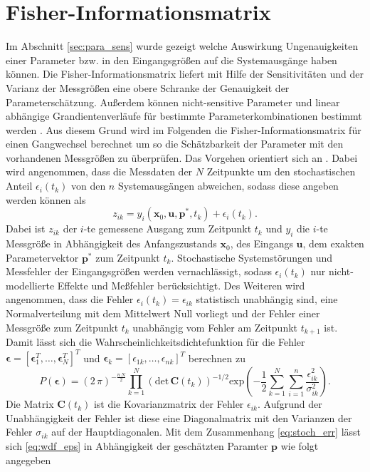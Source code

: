 \section{Fisher-Informationsmatrix}
Im Abschnitt \ref{sec:para_sens} wurde gezeigt welche Auswirkung Ungenauigkeiten einer Parameter bzw. in den Eingangsgrößen auf die Systemausgänge haben können. Die Fisher-Informationsmatrix liefert mit Hilfe der Sensitivitäten und der Varianz der Messgrößen eine obere Schranke der Genauigkeit der Parameterschätzung. Außerdem können nicht-sensitive Parameter und linear abhängige Grandientenverläufe für bestimmte Parameterkombinationen bestimmt werden \cite{Majer.1998}. Aus diesem Grund wird im Folgenden die Fisher-Informationsmatrix für einen Gangwechsel berechnet um so die Schätzbarkeit der Parameter mit den vorhandenen Messgrößen zu überprüfen. Das Vorgehen orientiert sich an \cite{Majer.1998}. Dabei wird angenommen, dass die Messdaten der $N$ Zeitpunkte um den stochastischen Anteil $\epsilon_i(t_k)$ von den $n$ Systemausgängen abweichen, sodass diese angeben werden können als
\begin{equation}\label{eq:stoch_err}
z_{ik} = y_i(\pmb{x}_0,\pmb{u},\pmb{p}^*,t_k) + \epsilon_i(t_k).
\end{equation}
Dabei ist $z_{ik}$ der $i$-te gemessene Ausgang zum Zeitpunkt $t_k$ und $y_i$ die $i$-te Messgröße in Abhängigkeit des Anfangszustands $\pmb{x}_0$, des Eingangs $\pmb{u}$, dem exakten Parametervektor $\pmb{p}^*$ zum Zeitpunkt $t_k$. Stochastische Systemstörungen und Messfehler der Eingangsgrößen werden vernachlässigt, sodass $\epsilon_i(t_k)$ nur nicht-modellierte Effekte und Meßfehler berücksichtigt. Des Weiteren wird angenommen, dass die Fehler  $\epsilon_i(t_k) = \epsilon_{ik}$ statistisch unabhängig sind, eine Normalverteilung mit dem Mittelwert Null vorliegt und der Fehler einer Messgröße zum Zeitpunkt $t_k$ unabhängig vom Fehler am Zeitpunkt $t_{k+1}$ ist. Damit lässt sich die Wahrscheinlichkeitsdichtefunktion für die Fehler $\pmb{\epsilon} = [\pmb{\epsilon}_1^T,\dots,\pmb{\epsilon}_N^T]^T$ und $\pmb{\epsilon}_k = [\epsilon_{1k},\dots,\epsilon_{nk}]^T$ berechnen zu
\begin{equation}\label{eq:wdf_eps}
P(\pmb{\epsilon}) = (2\, \pi)^{-\frac{n\,N}{2}}\prod^N_{k=1}\left(\mathrm{det}\,\pmb{C}(t_k)\right)^{-1/2}\mathrm{exp}\left(-\frac{1}{2}\sum^N_{k=1}\sum^n_{i=1}\frac{\epsilon^2_{ik}}{\sigma^2_{ik}}\right).
\end{equation}
Die Matrix $\pmb{C}(t_k)$ ist die Kovarianzmatrix der Fehler $\epsilon_{ik}$. Aufgrund der Unabhängigkeit der Fehler ist diese eine Diagonalmatrix mit den Varianzen der Fehler $\sigma_{ik}$ auf der Hauptdiagonalen. Mit dem Zusammenhang \eqref{eq:stoch_err} lässt sich \eqref{eq:wdf_eps} in Abhängigkeit der geschätzten Paramter $\pmb{p}$ wie folgt angegeben
